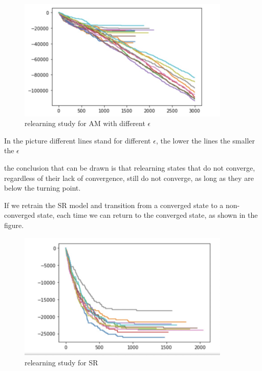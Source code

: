\documentclass[11pt]{article}
\begin{document}
\begin{figure}[H]
	\begin{center}
	\includegraphics[width=0.9\textwidth]{58.PNG}
	\end{center}
	\caption{relearning study for AM with different $\epsilon$}
	\label{FIG.58}
\end{figure}

In the picture different lines stand for different $\epsilon$, the lower the lines
the smaller the $\epsilon$

the conclusion that can be drawn is that relearning states that do not converge, 
regardless of their lack of convergence, still do not converge, 
as long as they are below the turning point.

If we retrain the SR model and transition from a converged state to a non-converged 
state, each time we can return to the converged state, as shown in the figure.

\begin{figure}[H]
	\begin{center}
	\includegraphics[width=0.9\textwidth]{59.PNG}
	\end{center}
	\caption{relearning study for SR}
	\label{FIG.59}
\end{figure}
\end{document}
